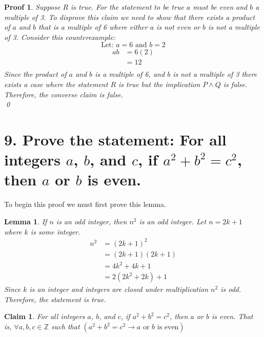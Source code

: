 \documentclass{article}
\newtheorem*{claim}{Claim}
\newtheorem{lemma}{Lemma}
\newtheorem*{myproof}{Proof}
\begin{document}
\begin{myproof}
Suppose $R$ is true. For the statement to be true $a$ must be even and $b$ a multiple of 3. To disprove this claim we need to show that there exists a product of $a$ and $b$ that is a multiple of 6 where either $a$ is not even or $b$ is not a multiple of 3. Consider this counterexample:
$$\text{Let: } a = 6 \text{ and } b = 2 $$
\begin{align*}
       ab &= 6(2) \\
       &= 12 \\
\end{align*}
Since the product of $a$ and $b$ is a multiple of 6, and $b$ is not a multiple of 3 there exists a case where the statement $R$ is true but the implication $P \wedge Q$ is false. Therefore, the converse claim is false. \\
\qed
\end{myproof}

\newpage

\section*{9. Prove the statement: For all integers $a$, $b$, and $c$, if $a^2+b^2=c^2$, then $a$ or $b$ is even.}
To begin this proof we must first prove this lemma.
\begin{lemma}
    If $n$ is an odd integer, then $n^2$ is an odd integer. Let $n = 2k+1$ where $k$ is some integer.
    \begin{align*}
        n^2 &= (2k+1)^2 \\
        &= (2k+1)(2k+1) \\ 
        &= 4k^2+4k+1 \\
        &= 2(2k^2+2k)+1
    \end{align*}
    Since $k$ is an integer and integers are closed under multiplication $n^2$ is odd. Therefore, the statement is true.
\end{lemma}
\begin{claim}
    For all integers $a$, $b$, and $c$, if $a^2+b^2=c^2$, then $a$ or $b$ is even. That is, $\forall a,b,c \in \mathbb{Z}$ such that $(a^2+b^2=c^2 \rightarrow a \text{ or } b \text{ is even})$
\end{claim}
\end{document}
